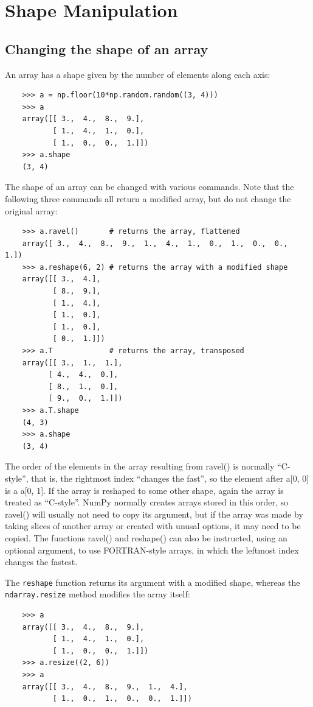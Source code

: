\documentclass[UTF8]{article}
\begin{document}
\section{Shape Manipulation}
\subsection{Changing the shape of an array}
An array has a shape given by the number of elements along each axis:
\begin{verbatim}
    >>> a = np.floor(10*np.random.random((3, 4)))
    >>> a
    array([[ 3.,  4.,  8.,  9.],
           [ 1.,  4.,  1.,  0.],
           [ 1.,  0.,  0.,  1.]])
    >>> a.shape
    (3, 4)
\end{verbatim}

The shape of an array can  be changed with various commands. Note that the following three commands
all return a modified array, but do not change the original array:
\begin{verbatim}
    >>> a.ravel()       # returns the array, flattened
    array([ 3.,  4.,  8.,  9.,  1.,  4.,  1.,  0.,  1.,  0.,  0.,  1.])
    >>> a.reshape(6, 2) # returns the array with a modified shape
    array([[ 3.,  4.],
           [ 8.,  9.],
           [ 1.,  4.],
           [ 1.,  0.],
           [ 1.,  0.],
           [ 0.,  1.]])
    >>> a.T             # returns the array, transposed
    array([[ 3.,  1.,  1.],
          [ 4.,  4.,  0.],
          [ 8.,  1.,  0.],
          [ 9.,  0.,  1.]])
    >>> a.T.shape
    (4, 3)
    >>> a.shape
    (3, 4)
\end{verbatim}

The order of the elements in the array resulting from ravel() is normally ``C-style'', that is, the
rightmost index ``changes the fast'', so the element after a[0, 0] is a a[0, 1]. If the array is
reshaped to some other shape, again the array is treated as ``C-style''. NumPy normally creates
arrays stored in this order, so ravel() will usually not need to copy its argument, but if the
array was made by taking slices of another array or created with unusal options, it may need to be
copied. The functions ravel() and reshape() can also be instructed, using an optional argument, to
use FORTRAN-style arrays, in which the leftmost index changes the fastest.

The \texttt{reshape} function returns its argument with a modified shape, whereas the
\texttt{ndarray.resize} method modifies the array itself:
\begin{verbatim}
    >>> a
    array([[ 3.,  4.,  8.,  9.],
           [ 1.,  4.,  1.,  0.],
           [ 1.,  0.,  0.,  1.]])
    >>> a.resize((2, 6))
    >>> a
    array([[ 3.,  4.,  8.,  9.,  1.,  4.],
           [ 1.,  0.,  1.,  0.,  0.,  1.]])
\end{verbatim}
\end{document}
